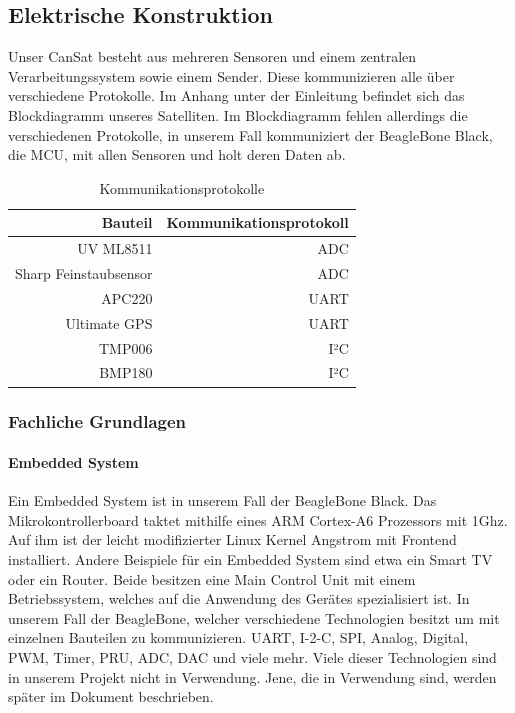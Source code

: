 \subsection{Elektrische Konstruktion}
Unser CanSat besteht aus mehreren Sensoren und einem zentralen Verarbeitungssystem sowie einem Sender. Diese kommunizieren alle über verschiedene Protokolle. Im Anhang unter der Einleitung befindet sich das Blockdiagramm unseres Satelliten. Im Blockdiagramm fehlen allerdings die verschiedenen Protokolle, in unserem Fall kommuniziert der BeagleBone Black, die MCU, mit allen Sensoren und holt deren Daten ab.

\begin{table}[H]
  \centering
    \begin{tabular}{rr}
    \toprule
    \textbf{Bauteil} & \textbf{Kommunikationsprotokoll} \\
    \midrule 
    UV ML8511 & ADC \\
    Sharp Feinstaubsensor & ADC \\
    APC220 & UART \\
    Ultimate GPS & UART \\
    TMP006 & I²C \\
    BMP180 & I²C \\
    \bottomrule
    \end{tabular}
    \caption{Kommunikationsprotokolle}
\end{table}

\subsubsection{Fachliche Grundlagen}
\paragraph{Embedded System}
Ein Embedded System ist in unserem Fall der BeagleBone Black. Das Mikrokontrollerboard taktet mithilfe eines ARM Cortex-A6 Prozessors mit 1Ghz. Auf ihm ist der leicht modifizierter Linux Kernel Angstrom mit Frontend installiert. Andere Beispiele für ein Embedded System sind etwa ein Smart TV oder ein Router. Beide besitzen eine Main Control Unit mit einem Betriebssystem, welches auf die Anwendung des Gerätes spezialisiert ist. In unserem Fall der BeagleBone, welcher verschiedene Technologien besitzt um mit einzelnen Bauteilen zu kommunizieren. UART, I-2-C, SPI, Analog, Digital, PWM, Timer, PRU, ADC, DAC und viele mehr. Viele dieser Technologien sind in unserem Projekt nicht in Verwendung. Jene, die in Verwendung sind, werden später im Dokument beschrieben.


